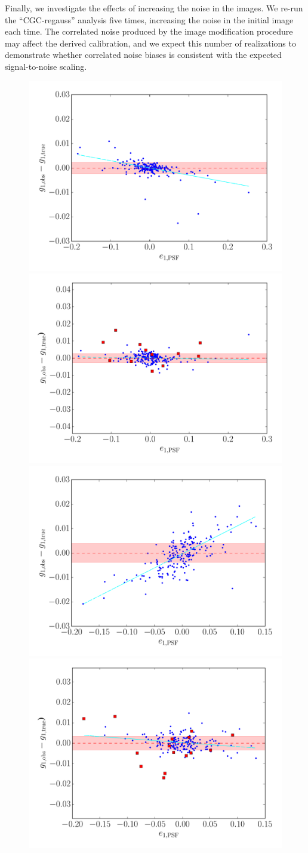 \documentclass[iop]{emulateapj}
\begin{document}
Finally, we investigate the effects of increasing the noise in the
images. We re-run the ``CGC-regauss'' analysis five times, increasing
the noise in the initial image each time. The correlated noise
produced by the image modification procedure may affect the derived
calibration, and we expect this number of realizations to demonstrate
whether correlated noise biases is consistent with the expected 
signal-to-noise scaling. %
%


\begin{figure}
\begin{center}
\includegraphics[width=0.4\linewidth]{psf_e1-no_corrections-rgc-regauss.pdf}
\includegraphics[width=0.4\linewidth]{psf_e1-rgc-regauss-opt-shear_plots.pdf}
\includegraphics[width=0.4\linewidth]{psf_e1-no_corrections-ksb.pdf}
\includegraphics[width=0.4\linewidth]{psf_e1-ksb-opt-shear_plots.pdf}

\end{center}
\end{figure}
\end{document}
